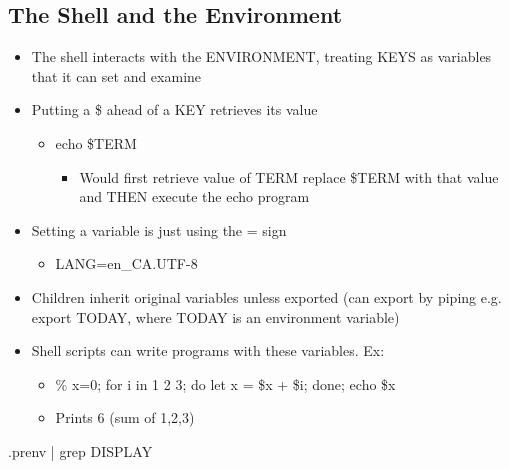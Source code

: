 \subsection{The Shell and the Environment}
\begin{itemize}
    \item The shell interacts with the ENVIRONMENT, treating KEYS as variables that it can set and examine
    \item Putting a \$ ahead of a KEY retrieves its value
    \begin{itemize}
        \item echo \$TERM
        \begin{itemize}
            \item Would first retrieve value of TERM replace \$TERM with that value and THEN execute the echo program
        \end{itemize}
    \end{itemize}
    \item Setting a variable is just using the = sign
    \begin{itemize}
        \item LANG=en\_CA.UTF-8
    \end{itemize}
    \item Children inherit original variables unless exported (can export by piping e.g. export TODAY, where TODAY is an environment variable)
    \item Shell scripts can write programs with these variables. Ex:
    \begin{itemize}
        \item \% x=0; for i in 1 2 3; do let x = \$x + \$i; done; echo \$x
        \item Prints 6 (sum of 1,2,3)
    \end{itemize}
\end{itemize}
.prenv | grep DISPLAY
